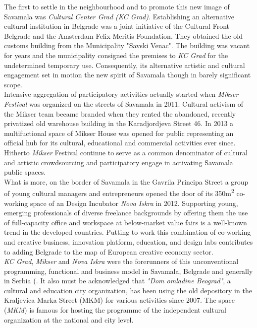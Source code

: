\documentclass[11pt]{report}
\begin{document}
The first to settle in the neighbourhood and to promote this new image of Savamala was \textit{Cultural Center Grad (KC Grad)}. Establishing an alternative cultural institution in Belgrade was a joint initiative of the Cultural Front Belgrade and the Amsterdam Felix Meritis Foundation.
They obtained the old customs building from the Municipality "Savski Venac".
The building was vacant for years and the municipality consigned the premises to \textit{KC Grad} for the undetermined temporary use.
Consequently, its alternative artistic and cultural engagement set in motion the new spirit of Savamala though in barely significant scope.
\\
Intensive aggregation of participatory activities actually started when \textit{Mikser Festival} was organized on the streets of Savamala in 2011.
Cultural activism of the Mikser team became branded when they rented the abandoned, recently privatized old warehouse building in the Karadjordjeva Street 46.
In 2013 a multifuctional space of Mikser House was opened for public representing an official hub for its cultural, educational and commercial activities ever since. Hitherto \textit{Mikser} Festival continue to serve as a common denominator of cultural and artistic crowdsourcing and participatory engage in activating Savamala public spaces.
\\
What is more, on the border of Savamala in the Gavrila Principa Street a group of young cultural managers and entrepreneurs opened the door of its 350m\textsuperscript{2} co-working space of an Design Incubator \textit{Nova  Iskra} in 2012.
Supporting young, emerging professionals of diverse freelance backgrounds by offering them the use of full-capacity office and workspace at below-market value fairs is a well-known trend in the developed countries. Putting to work this combination of co-working and creative business, innovation platform, education, and design labs contributes to adding Belgrade to the map of European creative economy sector. 
\\
\textit{KC Grad}, \textit{Mikser} and \textit{Nova Iskra} were the forerunners of this unconventional programming, functional and business model in Savamala, Belgrade and generally in Serbia (\href{ref}{\citealt{doytchinov_urban_2015}}. %
It also must be acknowledged that \textit{"Dom omladine Beograd"}, a cultural and education city organization, has been using the old depository in the Kraljevica Marka Street (MKM) for various activities since 2007.
The space (\textit{MKM}) is famous for hosting the programme of the independent cultural organization at the national and city level.
\end{document}
